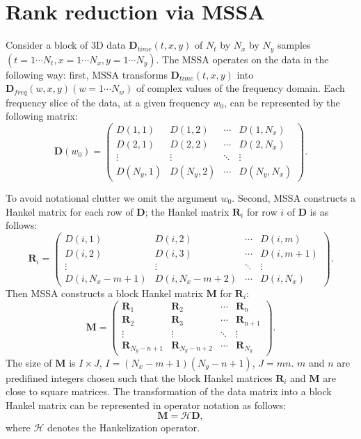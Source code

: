 \section{Rank reduction via MSSA}
Consider a block of 3D data $\mathbf{D}_{time}(t,x,y)$ of $N_t$ by $N_x$ by $N_y$ samples $(t=1\cdots N_t,x=1\cdots N_x,y=1\cdots N_y)$. The MSSA \cite[]{oropezamssa} operates on the data in the following way: first, MSSA transforms $\mathbf{D}_{time}(t,x,y)$ into $\mathbf{D}_{freq}(w,x,y)(w=1\cdots N_w)$ of complex values of the frequency domain. Each frequency slice of the data, at a given frequency $w_0$, can be represented by the following matrix:
\begin{equation}
\label{eq:mssa}
\mathbf{D}(w_0)=\left(\begin{array}{cccc}
D(1,1) & D(1,2) & \cdots &D(1,N_x) \\
D(2,1) & D(2,2)  &\cdots &D(2,N_x) \\
\vdots & \vdots &\ddots &\vdots \\
D(N_y,1)&D(N_y,2) &\cdots&D(N_y,N_x)
\end{array}
\right).
\end{equation}

To avoid notational clutter we omit the argument $w_0$. Second, MSSA constructs a Hankel matrix for each row of $\mathbf{D}$; the Hankel matrix $\mathbf{R}_i$ for row $i$ of $\mathbf{D}$ is as follows:
\begin{equation}
\label{eq:data}
\mathbf{R}_i=\left(\begin{array}{cccc}
D(i,1) & D(i,2) & \cdots &D(i,m) \\
D(i,2) & D(i,3)  &\cdots &D(i,m+1) \\
\vdots & \vdots &\ddots &\vdots \\
D(i,N_x-m+1)&D(i,N_x-m+2) &\cdots&D(i,N_x)
\end{array}
\right).
\end{equation}
Then MSSA constructs a block Hankel matrix $\mathbf{M}$ for $\mathbf{R}_i$:
\begin{equation}
\label{eq:hankel2}
\mathbf{M}=\left(\begin{array}{cccc}
\mathbf{R}_1 &\mathbf{R}_2 & \cdots &\mathbf{R}_n \\
\mathbf{R}_2 &\mathbf{R}_3 &\cdots &\mathbf{R}_{n+1} \\
\vdots & \vdots &\ddots &\vdots \\
\mathbf{R}_{N_y-n+1}&\mathbf{R}_{N_y-n+2} &\cdots&\mathbf{R}_{N_y}
\end{array}
\right).
\end{equation}
The size of $\mathbf{M}$ is $I\times J$, $I=(N_x-m+1)(N_y-n+1)$, $J=mn$. $m$ and $n$ are predifined integers chosen such that the block Hankel matrices $\mathbf{R}_i$ and $\mathbf{M}$ are close to square matrices. The transformation of the data matrix into a block Hankel matrix can be represented in operator notation as follows:
\begin{equation}
\label{eq:hankelopt}
\mathbf{M}=\mathcal{H}\mathbf{D},
\end{equation}
where $\mathcal{H}$ denotes the Hankelization operator.

